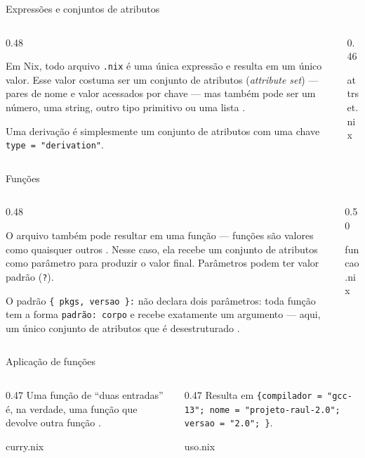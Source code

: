 \documentclass{beamer}
\newcommand{\en}[1]{\foreignlanguage{english}{\emph{#1}}}
\newcommand{\termo}[1]{\alert{#1}}
\newcommand{\code}[1]{\texttt{#1}}
\newlength{\nixcodelift}\setlength{\nixcodelift}{7pt}
\newcommand{\nixcode}[2]{\vspace*{-\nixcodelift}\begin{nixbox}{#2}\end{nixbox}}
\newcommand{\nixcodeinline}[2]{\vspace*{3.3pt}\begin{nixbox}{#2}\end{nixbox}}
\begin{document}
\begin{frame}{Expressões e conjuntos de atributos}
	\begin{columns}[T,onlytextwidth]
		\begin{column}{0.48\textwidth}
			\small\raggedright
			Em Nix, todo arquivo \code{.nix} é uma única expressão e resulta em um único valor. Esse valor costuma ser um \termo{conjunto de atributos} (\en{attribute set}) --- pares de nome e valor acessados por chave --- mas também pode ser um número, uma string, outro tipo primitivo ou uma lista \cite[sec.~Data Types]{nixmanual}.

			\medskip

			Uma \termo{derivação} é simplesmente um conjunto de atributos com uma chave \code{type = "derivation"}.
		\end{column}
		\begin{column}{0.46\textwidth}
			\nixcode{code/attrset}{attrset.nix}
		\end{column}
	\end{columns}
\end{frame}

\begin{frame}{Funções}
	\begin{columns}[T,onlytextwidth]
		\begin{column}{0.48\textwidth}
			\small\raggedright
			O arquivo também pode resultar em uma \termo{função} --- funções são valores como quaisquer outros \cite[sec.~Nix Language]{nixmanual}. Nesse caso, ela recebe um conjunto de atributos como parâmetro para produzir o valor final. Parâmetros podem ter valor padrão (\code{?}).

			\medskip
			O padrão \code{\{ pkgs, versao \}:} não declara dois parâmetros: toda função tem a forma \code{padrão: corpo} e recebe exatamente um argumento --- aqui, um único conjunto de atributos que é desestruturado \cite[sec.~Syntax]{nixmanual}.
		\end{column}
		\begin{column}{0.50\textwidth}
			\nixcode{code/funcao}{funcao.nix}
		\end{column}
	\end{columns}
\end{frame}

\begin{frame}{Aplicação de funções}
	\small
	\begin{columns}[T,onlytextwidth]
		\begin{column}{0.47\textwidth}
			Uma função de \enquote{duas entradas} é, na verdade, uma função que devolve outra função \cite[sec.~Syntax]{nixmanual}.

			\medskip

			\nixcodeinline{code/curry}{curry.nix}
		\end{column}
		\begin{column}{0.47\textwidth}
			Resulta em \code{\{compilador = "gcc-13"; nome = "projeto-raul-2.0"; versao = "2.0"; \}}.
		
			\medskip
		
			\nixcodeinline{code/uso}{uso.nix}
		\end{column}
	\end{columns}
\end{frame}
\end{document}
